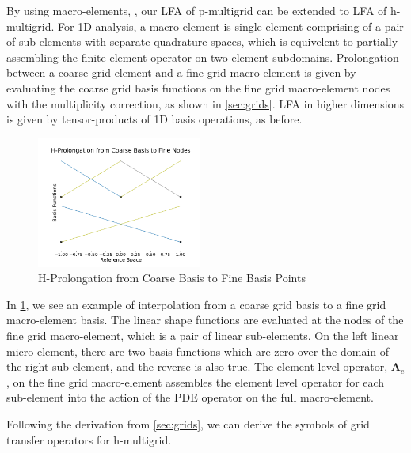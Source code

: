 \documentclass[review]{siamart190516}
\begin{document}
By using macro-elements, \cite{kumar2019local} \cite{brown2019local}, our LFA of p-multigrid can be extended to LFA of h-multigrid.
For 1D analysis, a macro-element is single element comprising of a pair of sub-elements with separate quadrature spaces, which is equivelent to partially assembling the finite element operator on two element subdomains.
Prolongation between a coarse grid element and a fine grid macro-element is given by evaluating the coarse grid basis functions on the fine grid macro-element nodes with the multiplicity correction, as shown in \cref{sec:grids}.
LFA in higher dimensions is given by tensor-products of 1D basis operations, as before.

\begin{figure}[!ht]
  \centering
  \includegraphics[width=0.48\textwidth]{img/hProlongation}
  \caption{H-Prolongation from Coarse Basis to Fine Basis Points}
  \label{fig:h_prolongation}
\end{figure}

In \cref{fig:h_prolongation}, we see an example of interpolation from a coarse grid basis to a fine grid macro-element basis.
The linear shape functions are evaluated at the nodes of the fine grid macro-element, which is a pair of linear sub-elements.
On the left linear micro-element, there are two basis functions which are zero over the domain of the right sub-element, and the reverse is also true.
The element level operator, $\mathbf{A}_e$, on the fine grid macro-element assembles the element level operator for each sub-element into the action of the PDE operator on the full macro-element.

Following the derivation from \cref{sec:grids}, we can derive the symbols of grid transfer operators for h-multigrid.
\end{document}
